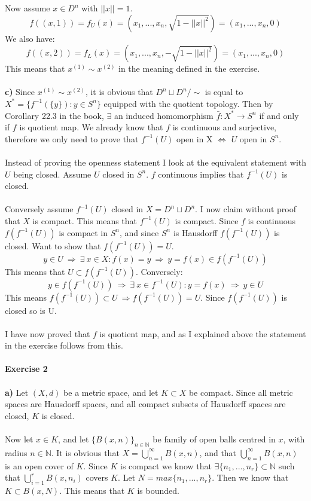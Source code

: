 \documentclass[11pt,a4paper]{report}
\begin{document}
Now assume $x\in D^n$ with $||x||=1$. $$f((x,1)) = f_U(x)=(x_1,...,x_n,\sqrt{1-||x||^2})=(x_1,...,x_n,0) $$ We also have: $$f((x,2)) = f_L(x)=(x_1,...,x_n,-\sqrt{1-||x||^2})=(x_1,...,x_n,0) $$ This means that $x^{(1)} \sim x^{(2)}$ in the meaning defined in the exercise. 
\\
\\
\textbf{c)} Since $x^{(1)} \sim x^{(2)}$, it is obvious that $D^n \sqcup D^n / \sim $ is equal to $X^*=\{ f^{-1}(\{y\}) : y\in S^n \} $ equipped with the quotient topology. Then by Corollary 22.3 in the book, $\exists$ an induced homomorphism $\bar{f}:X^* \rightarrow S^n$ if and only if $f$ is quotient map. We already know that $f$ is continuous and surjective, therefore we only need to prove that $f^{-1}(U)$ open in X $\iff$ $U$ open in $S^n$.
\\
\\
Instead of proving the openness statement I look at the equivalent statement with $U$ being closed. Assume $U$ closed in $S^n$. $f$ continuous implies that $f^{-1}(U)$ is closed.
\\
\\
Conversely assume $f^{-1}(U)$ closed in $X=D^n \sqcup D^n$. I now claim without proof that $X$ is compact. This means that $f^{-1}(U)$ is compact. Since $f$ is continuous $f(f^{-1}(U))$ is compact in $S^n$, and since $S^n$ is Hausdorff $f(f^{-1}(U))$ is closed. Want to show that $f(f^{-1}(U))=U$. $$y\in U \ \Rightarrow \ \exists \ x \in X : f(x)=y \ \Rightarrow \ y=f(x) \in f(f^{-1}(U)) $$ This means that $U \subset f(f^{-1}(U)) $. Conversely: $$y\in f(f^{-1}(U)) \ \Rightarrow \ \exists \ x \in f^{-1}(U):y=f(x) \ \Rightarrow \ y \in U $$ This means $f(f^{-1}(U)) \subset U \ \Rightarrow f(f^{-1}(U))=U $. Since $f(f^{-1}(U))$ is closed so is U. 
\\
\\
I have now proved that $f$ is quotient map, and as I explained above the statement in the exercise follows from this. 
\\
\\
\Large \textbf{Exercise 2} \Large
\\
\\
\textbf{a)} Let $(X,d)$ be a metric space, and let $K \subset X$ be compact. Since all metric spaces are Hausdorff spaces, and all compact subsets of Hausdorff spaces are closed, $K$ is closed.
\\
\\
Now let $x \in K$, and let $\{B(x,n)\}_{n \in \mathbb{N}}$ be family of open balls centred in $x$, with radius $n \in \mathbb{N}$. It is obvious that $X=\bigcup\limits_{n=1}^{\infty} B(x,n)$, and that $\bigcup\limits_{n=1}^{\infty} B(x,n)$ is an open cover of $K$. Since $K$ is compact we know that $\exists \{n_1,...,n_r\} \subset \mathbb{N}$ such that $\bigcup\limits_{i=1}^{r} B(x,n_i)$ covers $K$. Let $N=max\{n_1,...,n_r\}$. Then we know that $K \subset B(x,N)$. This means that $K$ is bounded. 
\end{document}
